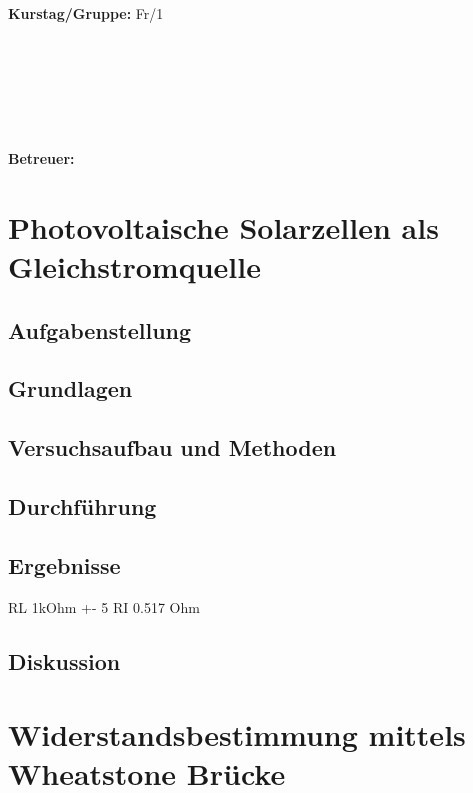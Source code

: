\documentclass{article}
\begin{document}
\begin{verbatim}


\end{verbatim}
			\begin{flushleft}
			\textbf{\Large{Kurstag/Gruppe:}} \Large{Fr/1}
			\end{flushleft}

\begin{verbatim}






\end{verbatim}
			\begin{flushleft}
			\LARGE{\textbf{Betreuer:}}	\Large{}	
			\end{flushleft}
\newpage	

\section{Photovoltaische Solarzellen als Gleichstromquelle}

\subsection{Aufgabenstellung}
\subsection{Grundlagen}
\subsection{Versuchsaufbau und Methoden}
\subsection{Durchführung}
\subsection{Ergebnisse}
RL 1kOhm +- 5%
RI 0.517 Ohm

\subsection{Diskussion}

\section{Widerstandsbestimmung mittels Wheatstone Brücke}
\end{document}
